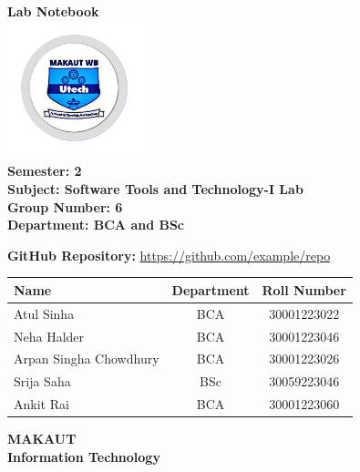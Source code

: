 \documentclass[a4paper,12pt]{article}
\begin{document}
\begin{titlepage}
    \centering
    \vspace*{0.5in}
    

    {\Huge\bfseries Lab Notebook \\[0.2cm]}
    \includegraphics[width=0.3\textwidth]{university_logo.png} \\[1.1cm]
    
    {\Large\bfseries Semester: 2 \\[0.5cm]}
    {\Large\bfseries Subject: Software Tools and Technology-I Lab \\[0.5cm]}
    {\Large\bfseries Group Number: 6 \\[0.5cm]}
    {\Large\bfseries Department: BCA and BSc \\[0.5cm]}
    
    {\Large \textbf{GitHub Repository:} \href{https://github.com/example/repo}{https://github.com/example/repo} \\[2cm]}
    
    \begin{tabular}{| l | c | c |}
        \hline
        \textbf{Name} & \textbf{Department} & \textbf{Roll Number} \\
        \hline
        Atul Sinha & BCA & 30001223022 \\
        \hline
        Neha Halder & BCA & 30001223046 \\
        \hline
        Arpan Singha Chowdhury & BCA & 30001223026 \\
        \hline
        Srija Saha & BSc & 30059223046 \\
        \hline
        Ankit Rai & BCA & 30001223060 \\
        \hline
    \end{tabular}

    \vfill

    {\large\bfseries MAKAUT \\ Information Technology}
\end{titlepage}
\end{document}
